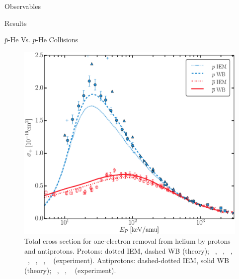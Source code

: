 \documentclass[letterpaper, 11 pt]{report}
\begin{document}
\begin{chapter}{Observables \label{chap:p-he2p-he}}
\begin{section}{Results \label{sec:phe2p-res}}
\begin{subsection}{ \texorpdfstring{$\bar{p}$}{pbar}-He Vs. \texorpdfstring{$p$}{p}-He Collisions
                         \label{sec:pbarhe-res}}
         \begin{figure}[ht]
            \begin{minipage}{.49\linewidth}
               
               \centering
               \includegraphics[width = \linewidth]{./images/pbarhe/pbarhe-+.eps}
               \caption[Total cross section for one-electron removal from helium by protons and
                        antiprotons.]
                       {Total cross section for one-electron removal from helium by protons and
                        antiprotons. Protons: dotted IEM, dashed WB (theory);
                        {\color{blue}{$\blacktriangle$}}~\cite{DTR84}, {\color{blue}{$+$}}~\cite{Sol62},
                        {\color{blue}{$\bullet$}}~\cite{SG89},
                        {\color{blue}{$\blacklozenge$}}~\cite{SG85},
                        {\color{blue}{$\blacktriangleright$}}~\cite{PM70},
                        {\color{blue}{$\blacktriangledown$}}~\cite{Wex64},
                        {\color{blue}{$\blacksquare$}}~\cite{KAH84} (experiment).
                        Antiprotons: dashed-dotted IEM, solid WB (theory);
                        {\color{red}{$\Box$}}~\cite{KKT08}, {\color{red}{$\circ$}}~\cite{HKM94},
                        {\color{red}{$\times$}}~\cite{AHK90} (experiment). \label{fig:he+}}
            \end{minipage} \hspace{0.04\linewidth} %
            \begin{minipage}{.49\linewidth}


\end{minipage}
\end{figure}
\end{subsection}
\end{section}
\end{chapter}
\end{document}
